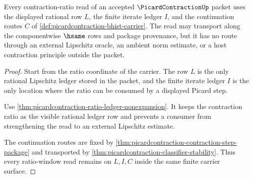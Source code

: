 \begin{theorem}
\label{thm:picardcontraction-lipschitz-ledger-window-exactness}
Every contraction-ratio read of an accepted $\PicardContractionUp$ packet uses the displayed rational row $L$, the finite iterate ledger $I$, and the continuation routes $C$ of \autoref{def:picardcontraction-bhist-carrier}. The read may transport along the componentwise $\hsame$ rows and package provenance, but it has no route through an external Lipschitz oracle, an ambient norm estimate, or a host contraction principle outside the packet.
\end{theorem}
\begin{proof}
Start from the ratio coordinate of the carrier. The row $L$ is the only rational Lipschitz ledger stored in the packet, and the finite iterate ledger $I$ is the only location where the ratio can be consumed by a displayed Picard step.

Use \autoref{thm:picardcontraction-ratio-ledger-nonexpansion}. It keeps the contraction ratio as the visible rational ledger row and prevents a consumer from strengthening the read to an external Lipschitz estimate.

The continuation routes are fixed by \autoref{thm:picardcontraction-contraction-step-package} and transported by \autoref{thm:picardcontraction-classifier-stability}. Thus every ratio-window read remains on $L,I,C$ inside the same finite carrier surface.
\end{proof}

